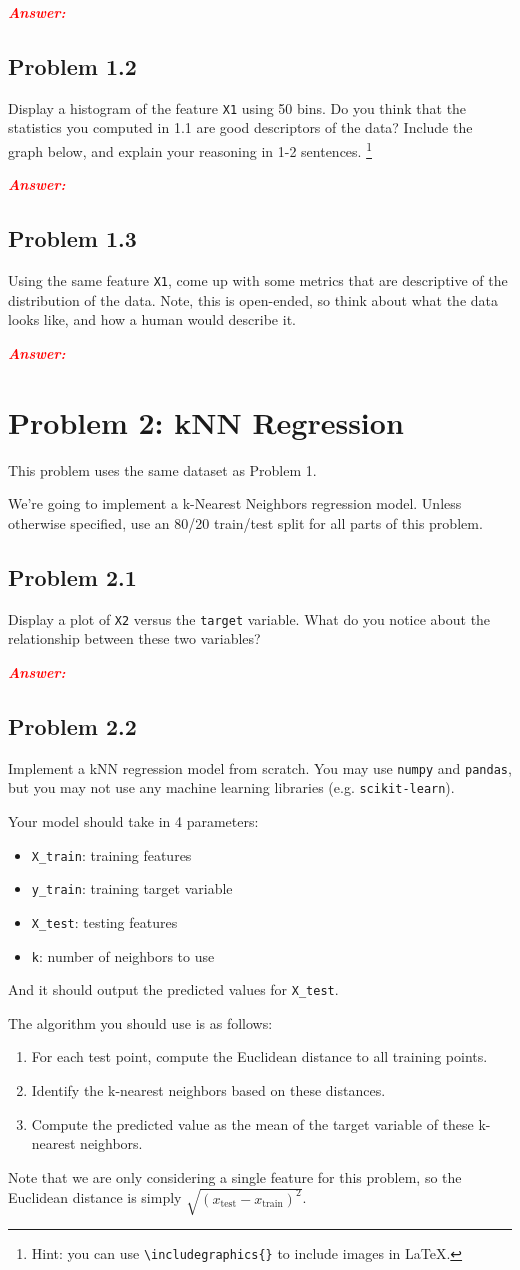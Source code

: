 \documentclass[11pt, letterpaper]{article}
\newcommand{\problem}[1]{\section*{Problem #1}}
\newcommand{\subproblem}[1]{\subsection*{Problem #1}}
\newcommand{\answer}{\textbf{\textit{\textcolor{red}{Answer:}}}\\}
\begin{document}
\answer

\subproblem{1.2}

Display a histogram of the feature \texttt{X1} using 50 bins. Do you think that 
the statistics you computed in 1.1 are good descriptors of the data? Include the graph below,
and explain your reasoning in 1-2 sentences. \footnote{Hint: you can use \texttt{\textbackslash includegraphics\{\}} to include images in \LaTeX.}

\answer

\subproblem{1.3}

Using the same feature \texttt{X1}, come up with some metrics that 
are descriptive of the distribution of the data. Note, this is open-ended,
so think about what the data looks like, and how a human would describe it.

\answer


\pagebreak

\problem{2: kNN Regression}

This problem uses the same dataset as Problem 1.

We're going to implement a k-Nearest Neighbors regression model. Unless otherwise specified, use an 80/20 train/test split for all parts of this problem.

\subproblem{2.1}

Display a plot of \texttt{X2} versus the \texttt{target} variable. What 
do you notice about the relationship between these two variables?

\answer

\subproblem{2.2}

Implement a kNN regression model from scratch. You may use \texttt{numpy} and \texttt{pandas}, but you may not use any machine learning libraries (e.g. \texttt{scikit-learn}).

Your model should take in 4 parameters:
\begin{itemize}
    \item \texttt{X\_train}: training features
    \item \texttt{y\_train}: training target variable
    \item \texttt{X\_test}: testing features
    \item \texttt{k}: number of neighbors to use
\end{itemize}
And it should output the predicted values for \texttt{X\_test}.

The algorithm you should use is as follows:
\begin{enumerate}
    \item For each test point, compute the Euclidean distance to all training points.
    \item Identify the k-nearest neighbors based on these distances.
    \item Compute the predicted value as the mean of the target variable of these k-nearest neighbors.
\end{enumerate}
Note that we are only considering a single feature for this problem, so the Euclidean distance is
simply $\sqrt{(x_{\text{test}} - x_{\text{train}})^2}$.
\end{document}
